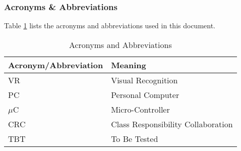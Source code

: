 \documentclass[titlepage]{article}
\begin{document}
\subsubsection{Acronyms \& Abbreviations}
Table \ref{tab:Acronyms} lists the acronyms and abbreviations used in this document.
\begin{table}[h!]
\centering
\caption{Acronyms and Abbreviations}
\begin{tabular}{| p{6cm} | p{6cm} |}\hline
	\textbf{Acronym/Abbreviation}	&\textbf{Meaning}\\\hline
	VR								&Visual Recognition\\\hline
	PC								&Personal Computer\\\hline
	$\mu$C							&Micro-Controller\\\hline
	CRC								&Class Responsibility Collaboration\\\hline
	TBT								&To Be Tested\\\hline
\end{tabular}
\label{tab:Acronyms}
\end{table}
\newpage
\end{document}

